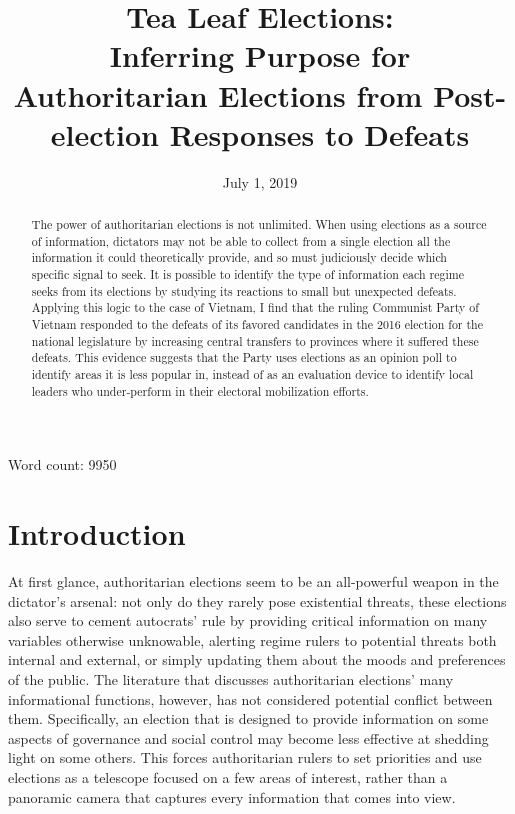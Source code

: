 \documentclass[12pt]{article}
\title{Tea Leaf Elections: \\
	Inferring Purpose for Authoritarian Elections from Post-election Responses to Defeats}
\date{July 1, 2019}
\newcommand{\1}{\mathbbm{1}}
\begin{document}
	

\maketitle
\thispagestyle{empty}
\doublespacing

\begin{abstract}
The power of authoritarian elections is not unlimited. When using elections as a source of information, dictators may not be able to collect from a single election all the information it could theoretically provide, and so must judiciously decide which specific signal to seek. It is possible to identify the type of information each regime seeks from its elections by studying its reactions to small but unexpected defeats. Applying this logic to the case of Vietnam, I find that the ruling Communist Party of Vietnam responded to the defeats of its favored candidates in the 2016 election for the national legislature by increasing central transfers to provinces where it suffered these defeats. This evidence suggests that the Party uses elections as an opinion poll to identify areas it is less popular in, instead of as an evaluation device to identify local leaders who under-perform in their electoral mobilization efforts.
\end{abstract}

Word count: 9950


\newpage
{}

\section{Introduction}

At first glance, authoritarian elections seem to be an all-powerful weapon in the dictator's arsenal: not only do they rarely pose existential threats, these elections also serve to cement autocrats' rule by providing critical information on many variables otherwise unknowable, alerting regime rulers to potential threats both internal and external, or simply updating them about the moods and preferences of the public. The literature that discusses authoritarian elections' many informational functions, however, has not considered potential conflict between them. Specifically, an election that is designed to provide information on some aspects of governance and social control may become less effective at shedding light on some others. This forces authoritarian rulers to set priorities and use elections as a telescope focused on a few areas of interest, rather than a panoramic camera that captures every information that comes into view.
\end{document}
